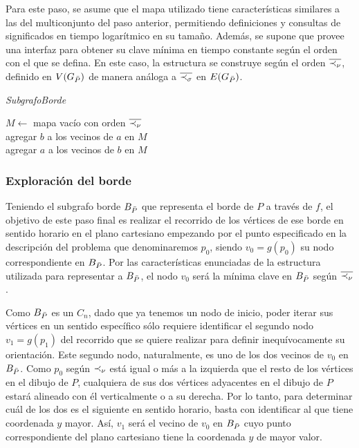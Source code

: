 Para este paso, se asume que el mapa utilizado tiene características similares a las del multiconjunto del paso anterior, permitiendo definiciones y consultas de significados en tiempo logarítmico en su tamaño. Además, se supone que provee una interfaz para obtener su clave mínima en tiempo constante según el orden con el que se defina. En este caso, la estructura se construye según el orden $\overline{\prec_{\nu}}$, definido en $V(G_{\bar{P}})$ de manera análoga a $\overline{\prec_{\sigma}}$ en $E(G_{\bar{P}})$.

\bigskip

\begin{algorithm}[H]
	\caption{\textit{SubgrafoBorde}}

	$M \gets$ mapa vacío con orden $\overline{\prec_{\nu}}$ \\
	
	     {
    		 {
			agregar $b$ a los vecinos de $a$ en $M$ \\
			agregar $a$ a los vecinos de $b$ en $M$ \\
		}
	}

\end{algorithm}

\subsubsection{Exploración del borde}

Teniendo el subgrafo borde $B_{\bar{P}}$ que representa el borde de $P$ a través de $f$, el objetivo de este paso final es realizar el recorrido de los vértices de ese borde en sentido horario en el plano cartesiano empezando por el punto especificado en la descripción del problema que denominaremos $p_0$, siendo $v_0 = g(p_0)$ su nodo correspondiente en $B_{\bar{P}}$. Por las características enunciadas de la estructura utilizada para representar a $B_{\bar{P}}$, el nodo $v_0$ será la mínima clave en $B_{\bar{P}}$ según $\overline{\prec_{\nu}}$.

Como $B_{\bar{P}}$ es un $C_n$, dado que ya tenemos un nodo de inicio, poder iterar sus vértices en un sentido específico sólo requiere identificar el segundo nodo $v_1 = g(p_1)$ del recorrido que se quiere realizar para definir inequívocamente su orientación. Este segundo nodo, naturalmente, es uno de los dos vecinos de $v_0$ en $B_{\bar{P}}$. Como $p_0$ según $\prec_{\nu}$ está igual o más a la izquierda que el resto de los vértices en el dibujo de $P$, cualquiera de sus dos vértices adyacentes en el dibujo de $P$ estará alineado con él verticalmente o a su derecha. Por lo tanto, para determinar cuál de los dos es el siguiente en sentido horario, basta con identificar al que tiene coordenada $y$ mayor. Así, $v_1$ será el vecino de $v_0$ en $B_{\bar{P}}$ cuyo punto correspondiente del plano cartesiano tiene la coordenada $y$ de mayor valor.


